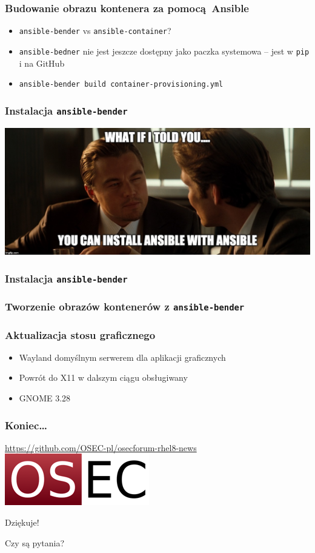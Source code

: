 \documentclass[dvipsnames,table]{beamer}
\begin{document}
\begin{frame}[fragile]
	\frametitle{Budowanie obrazu kontenera za pomocą Ansible}
%	
\begin{itemize}
	\item {\tt ansible-bender} vs {\tt ansible-container}?
	\item {\tt ansible-bedner} nie jest jeszcze dostępny jako paczka systemowa -- jest w {\tt pip} i na GitHub
	\item {\tt ansible-bender build container-provisioning.yml}
\end{itemize}
\end{frame}

\begin{frame}[fragile]
	\frametitle{Instalacja {\tt ansible-bender}}
\begin{center}
\includegraphics[scale=0.13]{img-ansibleinception.jpg}
\end{center}

\end{frame}

\begin{frame}[fragile]
	\frametitle{Instalacja {\tt ansible-bender}}

\end{frame}

\begin{frame}[fragile]
	\frametitle{Tworzenie obrazów kontenerów z {\tt ansible-bender}}

\end{frame}

\begin{frame}[fragile]
	\frametitle{Aktualizacja stosu graficznego}
\begin{itemize}
	\item{Wayland domyślnym serwerem dla aplikacji graficznych}
	\item{Powrót do X11 w dalszym ciągu obsługiwany}
	\item{GNOME 3.28}
\end{itemize}
\end{frame}

\begin{frame}
\frametitle{Koniec\ldots}
\begin{center}
\href{https://github.com/OSEC-pl/osecforum-rhel8-news}{https://github.com/OSEC-pl/osecforum-rhel8-news}
\includegraphics[scale=0.5]{img-oseclogo.png}

Dziękuje!

Czy są pytania?

\end{center}
\end{frame}
\end{document}
